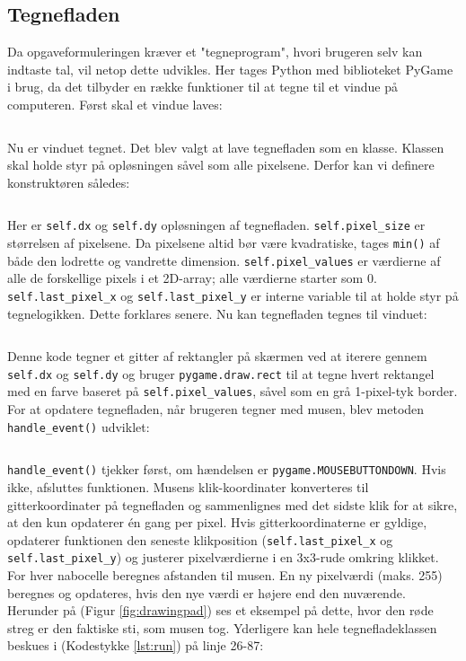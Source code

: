 \documentclass{article}
\newcommand{\figureref}[1]{(Figur \ref{#1})}
\newcommand{\listingref}[1]{(Kodestykke \ref{#1})}
\begin{document}
\subsection{Tegnefladen}
Da opgaveformuleringen kræver et "tegneprogram", hvori brugeren selv kan indtaste tal, vil netop dette udvikles. Her tages Python med biblioteket PyGame i brug, da det tilbyder en række funktioner til at tegne til et vindue på computeren. Først skal et vindue laves:
\inputminted[firstline=8, lastline=11]{python}{run.py}\noindent
Nu er vinduet tegnet. Det blev valgt at lave tegnefladen som en klasse. Klassen skal holde styr på opløsningen såvel som alle pixelsene. Derfor kan vi definere konstruktøren således:
\inputminted[firstline=26, lastline=34]{python}{run.py}\noindent
Her er \texttt{self.dx} og \texttt{self.dy} opløsningen af tegnefladen. \texttt{self.pixel\_size} er størrelsen af pixelsene. Da pixelsene altid bør være kvadratiske, tages \texttt{min()} af både den lodrette og vandrette dimension. \texttt{self.pixel\_values} er værdierne af alle de forskellige pixels i et 2D-array; alle værdierne starter som 0. \texttt{self.last\_pixel\_x} og \texttt{self.last\_pixel\_y} er interne variable til at holde styr på tegnelogikken. Dette forklares senere. Nu kan tegnefladen tegnes til vinduet:
\inputminted[firstline=62, lastline=74]{python}{run.py}\noindent
Denne kode tegner et gitter af rektangler på skærmen ved at iterere gennem \texttt{self.dx} og \texttt{self.dy} og bruger \texttt{pygame.draw.rect} til at tegne hvert rektangel med en farve baseret på \texttt{self.pixel\_values}, såvel som en grå 1-pixel-tyk border. For at opdatere tegnefladen, når brugeren tegner med musen, blev metoden \texttt{handle\_event()} udviklet:
\inputminted[firstline=36, lastline=60]{python}{run.py}\noindent
\texttt{handle\_event()} tjekker først, om hændelsen er \texttt{pygame.MOUSEBUTTONDOWN}. Hvis ikke, afsluttes funktionen. Musens klik-koordinater konverteres til gitterkoordinater på tegnefladen og sammenlignes med det sidste klik for at sikre, at den kun opdaterer én gang per pixel. Hvis gitterkoordinaterne er gyldige, opdaterer funktionen den seneste klikposition (\texttt{self.last\_pixel\_x} og \texttt{self.last\_pixel\_y}) og justerer pixelværdierne i en 3x3-rude omkring klikket. For hver nabocelle beregnes afstanden til musen. En ny pixelværdi (maks. 255) beregnes og opdateres, hvis den nye værdi er højere end den nuværende. Herunder på \figureref{fig:drawingpad} ses et eksempel på dette, hvor den røde streg er den faktiske sti, som musen tog. Yderligere kan hele tegnefladeklassen beskues i \listingref{lst:run} på linje 26-87:
\end{document}

